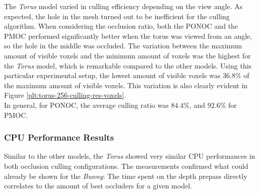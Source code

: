 
\noindent
The \emph{Torus} model varied in culling efficiency depending on the view angle. As expected, the hole 
in the mesh turned out to be inefficient for the culling algorithm. When considering the occlusion ratio, 
both the \ac{PONOC} and the \ac{PMOC} performed significantly better 
when the torus was viewed from an angle, so the hole in the middle was occluded. The variation between 
the maximum amount of visible voxels and the minimum amount of voxels was the highest for the \emph{Torus} 
model, which is remarkable compared to the other models. Using this particular experimental setup, the 
lowest amount of visible voxels was $36.8\%$ of the maximum amount of visible voxels. This variation is 
also clearly evident in Figure \ref{plt:torus-256-culling-res-voxels}. \\ 

\noindent
In general, for \ac{PONOC}, the average culling ratio was $84.4\%$, and $92.6\%$ for \ac{PMOC}. 

\subsubsection*{CPU Performance Results} \label{subsubsec-cpu-performance-results-torus}

Similar to the other models, the \emph{Torus} showed very similar \ac{CPU} performances in both 
occlusion culling configurations. The measurements confirmed what could already be shown for the 
\emph{Bunny}: The time spent on the depth prepass directly correlates to the amount of best occluders 
for a given model.



